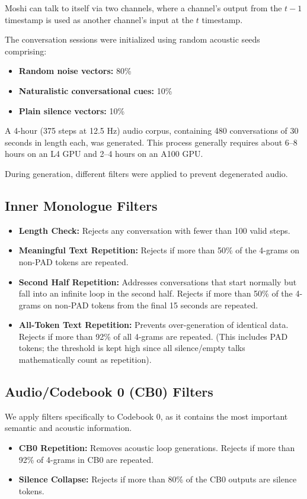 \documentclass[12pt]{article}
\begin{document}
Moshi can talk to itself via two channels, where a channel's output from the $t - 1$ timestamp is used as another channel's input at the $t$ timestamp.

The conversation sessions were initialized using random acoustic seeds comprising:
\begin{itemize}
    \item \textbf{Random noise vectors:} 80\%
    \item \textbf{Naturalistic conversational cues:} 10\%
    \item \textbf{Plain silence vectors:} 10\%
\end{itemize}

A 4-hour (375 steps at 12.5 Hz) audio corpus, containing 480 conversations of 30 seconds in length each, was generated. This process generally requires about 6--8 hours on an L4 GPU and 2--4 hours on an A100 GPU.

During generation, different filters were applied to prevent degenerated audio.

\subsection{Inner Monologue Filters}
\begin{itemize}
    \item \textbf{Length Check:} Rejects any conversation with fewer than 100 valid steps.
    \item \textbf{Meaningful Text Repetition:} Rejects if more than 50\% of the 4-grams on non-PAD tokens are repeated.
    \item \textbf{Second Half Repetition:} Addresses conversations that start normally but fall into an infinite loop in the second half. Rejects if more than 50\% of the 4-grams on non-PAD tokens from the final 15 seconds are repeated.
    \item \textbf{All-Token Text Repetition:} Prevents over-generation of identical data. Rejects if more than 92\% of all 4-grams are repeated. (This includes PAD tokens; the threshold is kept high since all silence/empty talks mathematically count as repetition).
\end{itemize}

\subsection{Audio/Codebook 0 (CB0) Filters}
We apply filters specifically to Codebook 0, as it contains the most important semantic and acoustic information.
\begin{itemize}
    \item \textbf{CB0 Repetition:} Removes acoustic loop generations. Rejects if more than 92\% of 4-grams in CB0 are repeated.
    \item \textbf{Silence Collapse:} Rejects if more than 80\% of the CB0 outputs are silence tokens.
\end{itemize}
\end{document}
